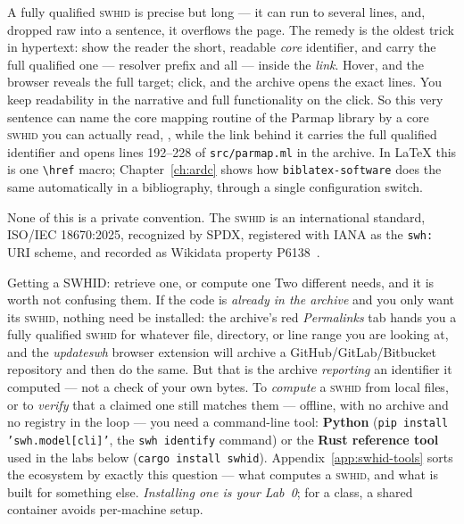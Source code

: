 A fully qualified \textsc{swhid} is precise but long --- it can run to several lines, and, dropped
raw into a sentence, it overflows the page. The remedy is the oldest trick in hypertext: show the
reader the short, readable \emph{core} identifier, and carry the full qualified one --- resolver
prefix and all --- inside the \emph{link}. Hover, and the browser reveals the full target; click,
and the archive opens the exact lines. You keep readability in the narrative and full functionality
on the click. So this very sentence can name the core mapping routine of the Parmap library by a
core \textsc{swhid} you can actually read,
,
while the link behind it carries the full qualified identifier and opens lines 192--228 of
\texttt{src/parmap.ml} in the archive. In \LaTeX{} this is one \texttt{\textbackslash href} macro;
Chapter~\ref{ch:ardc} shows how \texttt{biblatex-software} does the same automatically in a
bibliography, through a single configuration switch.

None of this is a private convention. The \textsc{swhid} is an international standard, ISO/IEC
18670:2025, recognized by SPDX, registered with IANA as the \texttt{swh:} URI scheme, and recorded
as Wikidata property P6138~\autocite{isoiec18670}.

\begin{callout}{Getting a SWHID: retrieve one, or compute one}
\small Two different needs, and it is worth not confusing them. If the code is \emph{already in the
archive} and you only want its \textsc{swhid}, nothing need be installed: the archive's red \emph{Permalinks}
tab hands you a fully qualified \textsc{swhid} for whatever file, directory, or line range you are
looking at, and the \emph{updateswh} browser extension will archive a GitHub/GitLab/Bitbucket
repository and then do the same. But that is the archive \emph{reporting} an identifier it computed
--- not a check of your own bytes. To \emph{compute} a \textsc{swhid} from local files, or to \emph{verify} that
a claimed one still matches them --- offline, with no archive and no registry in the loop --- you need
a command-line tool: \textbf{Python} (\texttt{pip install 'swh.model[cli]'}, the \texttt{swh identify}
command) or the \textbf{Rust reference tool} used in the labs below (\texttt{cargo install swhid}).
Appendix~\ref{app:swhid-tools} sorts the ecosystem by exactly this question --- what computes a
\textsc{swhid}, and what is built for something else. \emph{Installing one is your Lab~0}; for a class,
a shared container avoids per-machine setup.
\end{callout}

